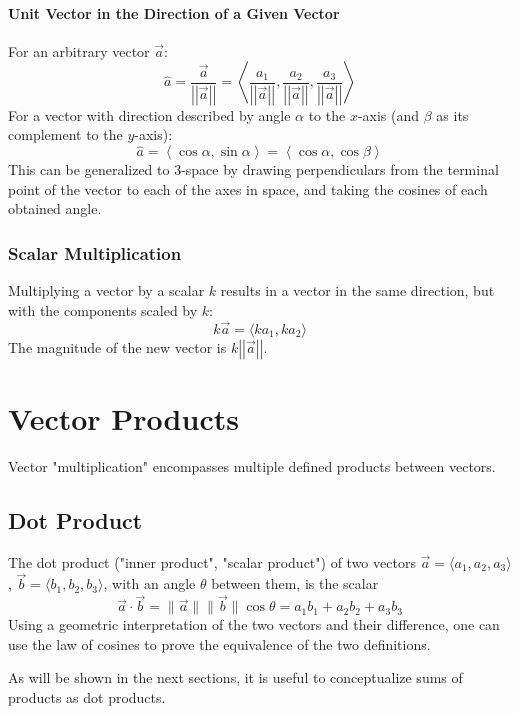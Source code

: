 \documentclass{article}
\newcommand{\vect}[1]{\ensuremath{\overrightarrow{#1}}}
\newcommand{\magnitude}[1]{\ensuremath{\lVert #1 \rVert}}
\newcommand{\magvect}[1]{\magnitude{\vect{#1}}}
\begin{document}
\paragraph{Unit Vector in the Direction of a Given Vector}
For an arbitrary vector $\overrightarrow{a}$:
$$\hat{a} = \frac{\overrightarrow{a}}{\left|\left|\overrightarrow{a}\right|\right|} = \left\langle \frac{a_1}{\left|\left|\overrightarrow{a}\right|\right|}, \frac{a_2}{\left|\left|\overrightarrow{a}\right|\right|}, \frac{a_3}{\left|\left|\overrightarrow{a}\right|\right|} \right\rangle$$
For a vector with direction described by angle $\alpha$ to the $x$-axis (and $\beta$ as its complement to the $y$-axis):
$$\hat{a} = \left\langle \cos{\alpha}, \sin{\alpha} \right\rangle = \left\langle \cos{\alpha}, \cos{\beta} \right\rangle$$
This can be generalized to 3-space by drawing perpendiculars from the terminal point of the vector to each of the axes in space, and taking the cosines of each obtained angle.

\subsubsection{Scalar Multiplication}
Multiplying a vector by a scalar $k$ results in a vector in the same direction, but with the components scaled by $k$:
$$k\overrightarrow{a} = \langle ka_1, ka_2 \rangle$$
The magnitude of the new vector is $k\left|\left|\overrightarrow{a}\right|\right|$.

\section{Vector Products}
Vector "multiplication" encompasses multiple defined products between vectors.

\subsection{Dot Product}
The dot product ("inner product", "scalar product") of two vectors $\vect{a} = \langle a_1, a_2, a_3 \rangle$, $\vect{b} = \langle b_1, b_2, b_3 \rangle$, with an angle $\theta$ between them, is the scalar
$$\vect{a} \cdot \vect{b} = \magvect{a}\magvect{b}\cos{\theta} = a_1b_1 + a_2b_2 + a_3b_3$$
Using a geometric interpretation of the two vectors and their difference, one can use the law of cosines to prove the equivalence of the two definitions.

As will be shown in the next sections, it is useful to conceptualize sums of products as dot products.
\end{document}
